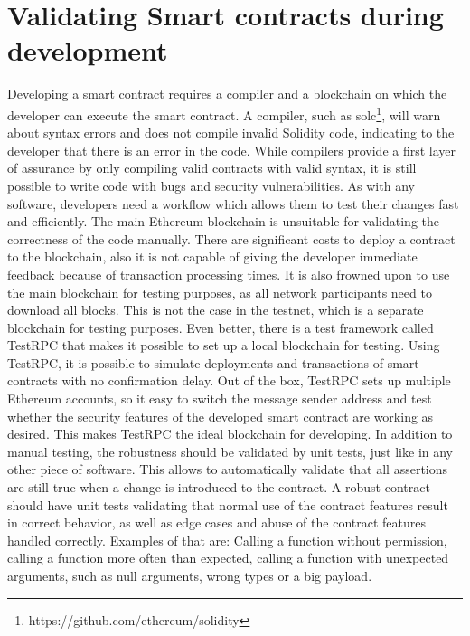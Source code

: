 \section{Validating Smart contracts during development}
Developing a smart contract requires a compiler and a blockchain on which the developer can execute the smart contract. A compiler, such as solc\footnote{https://github.com/ethereum/solidity}, will warn about syntax errors and does not compile invalid Solidity code, indicating to the developer that there is an error in the code. While compilers provide a first layer of assurance by only compiling valid contracts with valid syntax, it is still possible to write code with bugs and security vulnerabilities. As with any software, developers need a workflow which allows them to test their changes fast and efficiently. The main Ethereum blockchain is unsuitable for validating the correctness of the code manually. There are significant costs to deploy a contract to the blockchain, also it is not capable of giving the developer immediate feedback because of transaction processing times. It is also frowned upon to use the main blockchain for testing purposes, as all network participants need to download all blocks. This is not the case in the testnet, which is a separate blockchain for testing purposes. Even better, there is a test framework called TestRPC that makes it possible to set up a local blockchain for testing. Using TestRPC, it is possible to simulate deployments and transactions of smart contracts with no confirmation delay. Out of the box, TestRPC sets up multiple Ethereum accounts, so it easy to switch the message sender address and test whether the security features of the developed smart contract are working as desired. This makes TestRPC the ideal blockchain for developing.
In addition to manual testing, the robustness should be validated by unit tests, just like in any other piece of software. This allows to automatically validate that all assertions are still true when a change is introduced to the contract. A robust contract should have unit tests validating that normal use of the contract features result in correct behavior, as well as edge cases and abuse of the contract features handled correctly. Examples of that are: Calling a function without permission, calling a function more often than expected, calling a function with unexpected arguments, such as null arguments, wrong types or a big payload.
